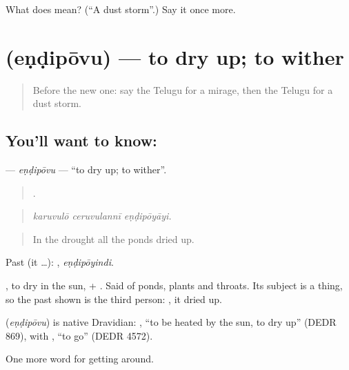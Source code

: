 \begin{tcolorbox}[breakable,colback=teal!4,colframe=teal!35!black,title={Before you move on}]
What does  mean? (\textquotedblleft{}A dust storm\textquotedblright{}.) Say it once more.
\end{tcolorbox}
\section[\texorpdfstring{\te{ఎండిపోవు} (eṇḍipōvu)}{ఎండిపోవు (eṇḍipōvu)}]{ (eṇḍipōvu) — to dry up; to wither}

\label{lesson:TE-C481-endipovu}



\begin{quote}
Before the new one: say the Telugu for a mirage, then the Telugu for a dust storm.
\end{quote}

\subsection*{You'll want to know: }
\textbf{} — \emph{eṇḍipōvu} — \textquotedblleft{}to dry up; to wither\textquotedblright{}.

\begin{quote}
  .
\end{quote}

\begin{quote}
\emph{karuvulō ceruvulannī eṇḍipōyāyi.}
\end{quote}

\begin{quote}
In the drought all the ponds dried up.
\end{quote}

Past (it …): , \emph{eṇḍipōyindi}.

, to dry in the sun, + . Said of ponds, plants and throats. Its subject is a thing, so the past shown is the third person: , it dried up.

\begin{cousinweb}
\textbf{} (\emph{eṇḍipōvu}) is native Dravidian: , \textquotedblleft{}to be heated by the sun, to dry up\textquotedblright{} (DEDR 869), with , \textquotedblleft{}to go\textquotedblright{} (DEDR 4572).
\end{cousinweb}

\begin{grammarlens}[title={What you've built}]
One more word for getting around.
\end{grammarlens}


